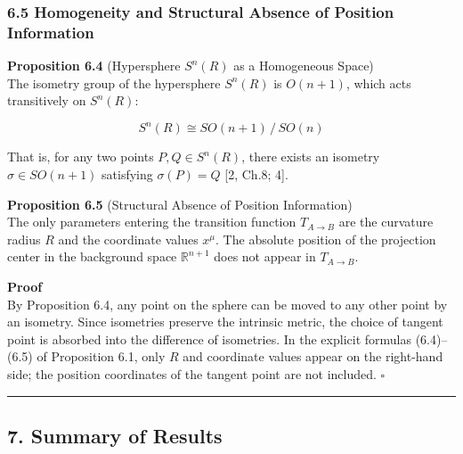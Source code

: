 \documentclass[a4paper,11pt]{article}
\theoremstyle{definition}
\begin{document}
\subsubsection{6.5 Homogeneity and Structural Absence of Position Information}\label{homogeneity-and-structural-absence-of-position-information}

\textbf{Proposition 6.4} (Hypersphere \(S^n(R)\) as a Homogeneous Space)\\
The isometry group of the hypersphere \(S^n(R)\) is \(O(n+1)\), which acts transitively on \(S^n(R)\):

\[S^n(R) \cong SO(n+1)\,/\,SO(n) \tag{6.8}\]

That is, for any two points \(P, Q \in S^n(R)\), there exists an isometry \(\sigma \in SO(n+1)\) satisfying \(\sigma(P) = Q\) {[}2, Ch.8; 4{]}.

\textbf{Proposition 6.5} (Structural Absence of Position Information)\\
The only parameters entering the transition function \(T_{A \to B}\) are the curvature radius \(R\) and the coordinate values \(x^\mu\). The absolute position of the projection center in the background space \(\mathbb{R}^{n+1}\) does not appear in \(T_{A \to B}\).

\textbf{Proof}\\
By Proposition 6.4, any point on the sphere can be moved to any other point by an isometry. Since isometries preserve the intrinsic metric, the choice of tangent point is absorbed into the difference of isometries. In the explicit formulas (6.4)--(6.5) of Proposition 6.1, only \(R\) and coordinate values appear on the right-hand side; the position coordinates of the tangent point are not included. \(\square\)

\begin{center}\rule{0.5\linewidth}{0.5pt}\end{center}

\subsection{7. Summary of Results}\label{summary-of-results}
\end{document}
